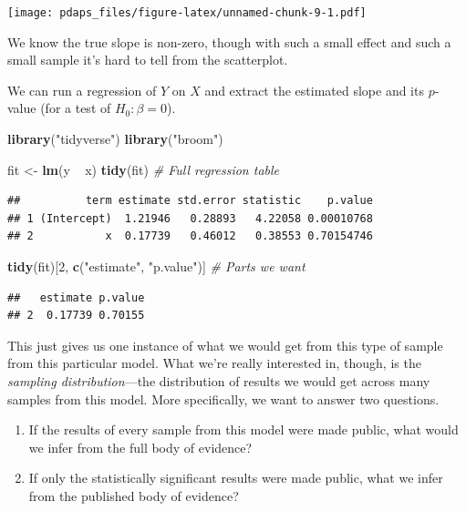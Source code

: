 \documentclass[12pt,oneside,openany]{book}
\newenvironment{Shaded}{\begin{snugshade}}{\end{snugshade}}
\newcommand{\KeywordTok}[1]{\textcolor[rgb]{0.13,0.29,0.53}{\textbf{{#1}}}}
\newcommand{\DecValTok}[1]{\textcolor[rgb]{0.00,0.00,0.81}{{#1}}}
\newcommand{\StringTok}[1]{\textcolor[rgb]{0.31,0.60,0.02}{{#1}}}
\newcommand{\CommentTok}[1]{\textcolor[rgb]{0.56,0.35,0.01}{\textit{{#1}}}}
\newcommand{\NormalTok}[1]{{#1}}
\begin{document}
\texttt{[image: pdaps\_files/figure-latex/unnamed-chunk-9-1.pdf]}

We know the true slope is non-zero, though with such a small effect and
such a small sample it's hard to tell from the scatterplot.

We can run a regression of \(Y\) on \(X\) and extract the estimated
slope and its \(p\)-value (for a test of \(H_0 : \beta = 0\)).

\begin{Shaded}
\begin{Highlighting}[]
\KeywordTok{library}\NormalTok{(}\StringTok{"tidyverse"}\NormalTok{)}
\KeywordTok{library}\NormalTok{(}\StringTok{"broom"}\NormalTok{)}

\NormalTok{fit <-}\StringTok{ }\KeywordTok{lm}\NormalTok{(y ~}\StringTok{ }\NormalTok{x)}
\KeywordTok{tidy}\NormalTok{(fit)  }\CommentTok{# Full regression table}
\end{Highlighting}
\end{Shaded}

\begin{verbatim}
##          term estimate std.error statistic    p.value
## 1 (Intercept)  1.21946   0.28893   4.22058 0.00010768
## 2           x  0.17739   0.46012   0.38553 0.70154746
\end{verbatim}

\begin{Shaded}
\begin{Highlighting}[]
\KeywordTok{tidy}\NormalTok{(fit)[}\DecValTok{2}\NormalTok{, }\KeywordTok{c}\NormalTok{(}\StringTok{"estimate"}\NormalTok{, }\StringTok{"p.value"}\NormalTok{)]  }\CommentTok{# Parts we want}
\end{Highlighting}
\end{Shaded}

\begin{verbatim}
##   estimate p.value
## 2  0.17739 0.70155
\end{verbatim}

This just gives us one instance of what we would get from this type of
sample from this particular model. What we're really interested in,
though, is the \emph{sampling distribution}---the distribution of
results we would get across many samples from this model. More
specifically, we want to answer two questions.

\begin{enumerate}
\def\labelenumi{\arabic{enumi}.}
\item
  If the results of every sample from this model were made public, what
  would we infer from the full body of evidence?
\item
  If only the statistically significant results were made public, what
  we infer from the published body of evidence?
\end{enumerate}
\end{document}
